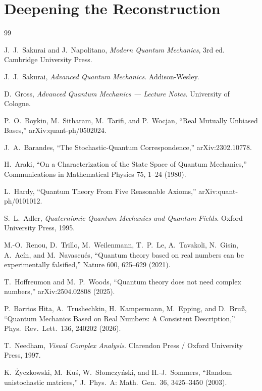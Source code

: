 \documentclass[11pt]{book}
\theoremstyle{plain}
\theoremstyle{definition}
\theoremstyle{remark}
\begin{document}
\part{Deepening the Reconstruction}






\appendix



\begin{thebibliography}{99}

J.~J.~Sakurai and J.~Napolitano, \textit{Modern Quantum Mechanics}, 3rd ed. Cambridge University Press.

J.~J.~Sakurai, \textit{Advanced Quantum Mechanics}. Addison-Wesley.

D.~Gross, \textit{Advanced Quantum Mechanics --- Lecture Notes}. University of Cologne.

P.~O.~Boykin, M.~Sitharam, M.~Tarifi, and P.~Wocjan, ``Real Mutually Unbiased Bases,'' arXiv:quant-ph/0502024.

J.~A.~Barandes, ``The Stochastic-Quantum Correspondence,'' arXiv:2302.10778.

H.~Araki, ``On a Characterization of the State Space of Quantum Mechanics,'' Communications in Mathematical Physics 75, 1--24 (1980).

L.~Hardy, ``Quantum Theory From Five Reasonable Axioms,'' arXiv:quant-ph/0101012.

S.~L.~Adler, \textit{Quaternionic Quantum Mechanics and Quantum Fields}. Oxford University Press, 1995.

M.-O.~Renou, D.~Trillo, M.~Weilenmann, T.~P.~Le, A.~Tavakoli, N.~Gisin, A.~Ac\'in, and M.~Navascu\'es, ``Quantum theory based on real numbers can be experimentally falsified,'' Nature 600, 625--629 (2021).

T.~Hoffreumon and M.~P.~Woods, ``Quantum theory does not need complex numbers,'' arXiv:2504.02808 (2025).

P.~Barrios Hita, A.~Trushechkin, H.~Kampermann, M.~Epping, and D.~Bru\ss, ``Quantum Mechanics Based on Real Numbers: A Consistent Description,'' Phys.\ Rev.\ Lett.\ 136, 240202 (2026).

T.~Needham, \textit{Visual Complex Analysis}. Clarendon Press / Oxford University Press, 1997.

K.~Życzkowski, M.~Kuś, W.~Słomczyński, and H.-J.~Sommers, ``Random unistochastic matrices,'' J.\ Phys.\ A: Math.\ Gen.\ 36, 3425--3450 (2003).

\end{thebibliography}

\printindex
\end{document}

